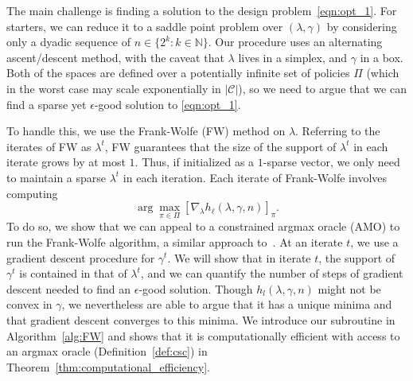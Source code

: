 \documentclass{article}
\newcommand{\1}{\mathbf{1}}
\begin{document}
The main challenge is finding a solution to the design problem~\eqref{eqn:opt_1}. For starters, we can reduce it to a saddle point problem over $(\lambda, \gamma)$ by considering only a dyadic sequence of $n \in \{2^k: k \in \mathbb{N}\}$. Our procedure uses an alternating ascent/descent method, with the caveat that $\lambda$ lives in a simplex, and $\gamma$ in a box. Both of the spaces are defined over a potentially infinite set of policies $\Pi$ (which in the worst case may scale exponentially in $|\mathcal{C}|$), so we need to argue that we can find a sparse yet $\epsilon$-good solution to \eqref{eqn:opt_1}. 

To handle this, we use the Frank-Wolfe (FW) method on $\lambda$. Referring to the iterates of FW as $\lambda^t$, FW guarantees that the size of the support of $\lambda^t$ in each iterate grows by at most $1$. Thus, if initialized as a $1$-sparse vector, we only need to maintain a sparse $\lambda^t$ in each iteration. Each iterate of Frank-Wolfe involves computing \[\arg\max_{\pi\in \Pi} [\nabla_{\lambda} h_{\ell}(\lambda, \gamma, n)]_{\pi}.\]
To do so, we show that we can appeal to a constrained argmax oracle (\textsf{AMO}) to run the Frank-Wolfe algorithm, a similar approach to~\cite{agarwal2014taming}. 
At an iterate $t$, we use a gradient descent procedure for $\gamma^t$. We will show that in iterate $t$, the support of $\gamma^t$ is contained in that of $\lambda^t$, and we can quantify the number of steps of gradient descent needed to find an $\epsilon$-good solution.
Though $h_{l}(\lambda, \gamma, n)$ might not be convex in $\gamma$, we nevertheless are able to argue that it has a unique minima and that gradient descent converges to this minima. We introduce our subroutine in Algorithm~\ref{alg:FW} and shows that it is computationally efficient with access to an argmax oracle (Definition~\ref{def:csc}) in Theorem~\ref{thm:computational_efficiency}. 
\end{document}

